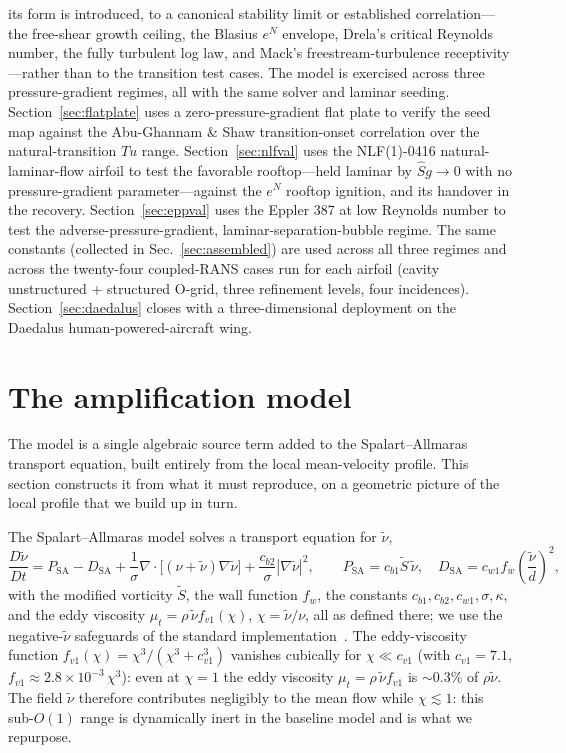 \documentclass[journal]{new-aiaa}
\begin{document}
its form is introduced, to a canonical stability limit or established
correlation---the free-shear growth ceiling, the Blasius $e^N$ envelope, Drela's
critical Reynolds number, the fully turbulent log law, and Mack's
freestream-turbulence receptivity---rather than to the transition test cases.
The model is exercised across three pressure-gradient regimes, all with the same
solver and laminar seeding.
Section~\ref{sec:flatplate} uses a zero-pressure-gradient flat plate to verify
the seed map against the Abu-Ghannam \& Shaw transition-onset correlation over
the natural-transition $Tu$ range.
Section~\ref{sec:nlfval} uses the NLF(1)-0416 natural-laminar-flow airfoil to
test the favorable rooftop---held laminar by $\hat S g\!\to\!0$ with no
pressure-gradient parameter---against the $e^N$ rooftop ignition, and its
handover in the recovery.
Section~\ref{sec:eppval} uses the Eppler 387 at low Reynolds number to test the
adverse-pressure-gradient, laminar-separation-bubble regime. The same
constants (collected in Sec.~\ref{sec:assembled}) are used across all three
regimes and across the twenty-four coupled-RANS cases run for each airfoil
(cavity unstructured $+$ structured O-grid, three refinement levels, four
incidences). Section~\ref{sec:daedalus} closes with a three-dimensional
deployment on the Daedalus human-powered-aircraft wing.

\section{The amplification model}\label{sec:model}\label{sec:calib}

The model is a single algebraic source term added to the Spalart--Allmaras
transport equation, built entirely from the local mean-velocity profile. This
section constructs it from what it must reproduce, on a geometric picture of
the local profile that we build up in turn.

The Spalart--Allmaras model \cite{spalart_allmaras_1992} solves a transport equation
for $\tilde\nu$,
\begin{equation}
  \frac{D\tilde\nu}{Dt} = P_\mathrm{SA} - D_\mathrm{SA}
  + \frac{1}{\sigma}\nabla\!\cdot\!\big[(\nu+\tilde\nu)\nabla\tilde\nu\big]
  + \frac{c_{b2}}{\sigma}|\nabla\tilde\nu|^2,
  \qquad
  P_\mathrm{SA} = c_{b1}\tilde S\,\tilde\nu,
  \quad
  D_\mathrm{SA} = c_{w1}f_w\!\left(\frac{\tilde\nu}{d}\right)^{\!2},
  \label{eq:sa}
\end{equation}
with the modified
vorticity $\tilde S$, the wall function $f_w$, the constants
$c_{b1},c_{b2},c_{w1},\sigma,\kappa$, and the eddy viscosity $\mu_t=\rho\,\tilde\nu f_{v1}(\chi)$,
$\chi=\tilde\nu/\nu$, all as defined there; we use the negative-$\tilde\nu$
safeguards of the standard implementation~\cite{allmaras_2012}. The eddy-viscosity function
$f_{v1}(\chi)\!=\!\chi^3/(\chi^3+c_{v1}^3)$ vanishes cubically for
$\chi\!\ll\!c_{v1}$ (with $c_{v1}\!=\!7.1$,
$f_{v1}\!\approx\!2.8\!\times\!10^{-3}\,\chi^3$): even at $\chi\!=\!1$ the
eddy viscosity $\mu_t\!=\!\rho\,\tilde\nu f_{v1}$ is $\sim\!0.3\%$ of
$\rho\tilde\nu$. The field $\tilde\nu$
therefore contributes negligibly to the mean flow while $\chi\lesssim1$: this
sub-$O(1)$ range is dynamically inert in the baseline model and is what we
repurpose.
\end{document}
